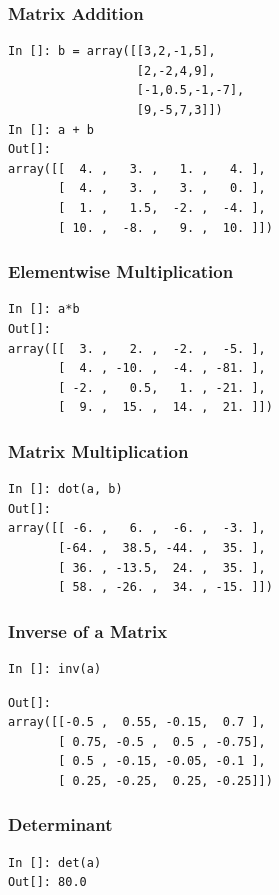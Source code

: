 \documentclass[14pt,compress]{beamer}
\begin{document}
\begin{frame}[fragile]
  \frametitle{Matrix Addition}
  \begin{lstlisting}
In []: b = array([[3,2,-1,5],
                  [2,-2,4,9],
                  [-1,0.5,-1,-7],
                  [9,-5,7,3]])
In []: a + b
Out[]: 
array([[  4. ,   3. ,   1. ,   4. ],
       [  4. ,   3. ,   3. ,   0. ],
       [  1. ,   1.5,  -2. ,  -4. ],
       [ 10. ,  -8. ,   9. ,  10. ]])
  \end{lstlisting}
\end{frame}

\begin{frame}[fragile]
\frametitle{Elementwise Multiplication}
\begin{lstlisting}
In []: a*b
Out[]: 
array([[  3. ,   2. ,  -2. ,  -5. ],
       [  4. , -10. ,  -4. , -81. ],
       [ -2. ,   0.5,   1. , -21. ],
       [  9. ,  15. ,  14. ,  21. ]])

\end{lstlisting}
\end{frame}

\begin{frame}[fragile]
\frametitle{Matrix Multiplication}
\begin{lstlisting}
In []: dot(a, b)
Out[]: 
array([[ -6. ,   6. ,  -6. ,  -3. ],
       [-64. ,  38.5, -44. ,  35. ],
       [ 36. , -13.5,  24. ,  35. ],
       [ 58. , -26. ,  34. , -15. ]])
\end{lstlisting}
\end{frame}

\begin{frame}[fragile]
\frametitle{Inverse of a Matrix}
\begin{lstlisting}
In []: inv(a)
\end{lstlisting}
\begin{small}
\begin{lstlisting}
Out[]: 
array([[-0.5 ,  0.55, -0.15,  0.7 ],
       [ 0.75, -0.5 ,  0.5 , -0.75],
       [ 0.5 , -0.15, -0.05, -0.1 ],
       [ 0.25, -0.25,  0.25, -0.25]])
\end{lstlisting}
\end{small}
\end{frame}

\begin{frame}[fragile]
\frametitle{Determinant}
\begin{lstlisting}
In []: det(a)
Out[]: 80.0
\end{lstlisting}
\end{frame}
\end{document}
